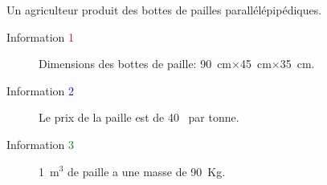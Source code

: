 Un agriculteur produit des bottes de pailles parallélépipédiques.

\begin{description}
\item[Information \textcolor{red}{1}] Dimensions des bottes de paille: 90~cm$\times$45~cm$\times$35~cm.
\begin{center}
\end{center}
\item[Information \textcolor{blue}{2}] Le prix de la paille est de 40~\eurologo{} par tonne.
\item[Information \textcolor{green}{3}] 1~m$^3$ de paille a une masse de 90~Kg.
\end{description}

